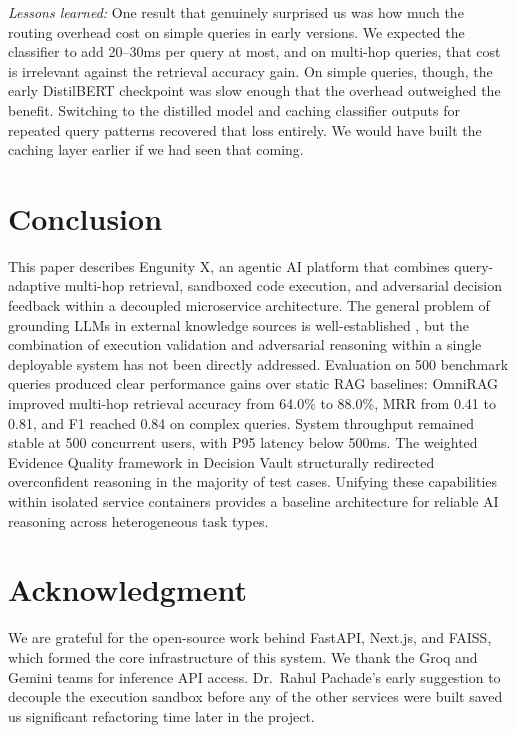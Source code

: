 \documentclass[conference]{IEEEtran}
\begin{document}
\textit{Lessons learned:} One result that genuinely surprised us was how much the routing overhead cost on simple queries in early versions. We expected the classifier to add 20--30ms per query at most, and on multi-hop queries, that cost is irrelevant against the retrieval accuracy gain. On simple queries, though, the early DistilBERT checkpoint was slow enough that the overhead outweighed the benefit. Switching to the distilled model and caching classifier outputs for repeated query patterns recovered that loss entirely. We would have built the caching layer earlier if we had seen that coming.

\section{Conclusion}

This paper describes Engunity X, an agentic AI platform that combines query-adaptive multi-hop retrieval, sandboxed code execution, and adversarial decision feedback within a decoupled microservice architecture. The general problem of grounding LLMs in external knowledge sources is well-established \cite{gao2023ragsurvey}, but the combination of execution validation and adversarial reasoning within a single deployable system has not been directly addressed. Evaluation on 500 benchmark queries produced clear performance gains over static RAG baselines: OmniRAG improved multi-hop retrieval accuracy from 64.0\% to 88.0\%, MRR from 0.41 to 0.81, and F1 reached 0.84 on complex queries. System throughput remained stable at 500 concurrent users, with P95 latency below 500ms. The weighted Evidence Quality framework in Decision Vault structurally redirected overconfident reasoning in the majority of test cases. Unifying these capabilities within isolated service containers provides a baseline architecture for reliable AI reasoning across heterogeneous task types.

\section*{Acknowledgment}

We are grateful for the open-source work behind FastAPI, Next.js, and FAISS, which formed the core infrastructure of this system. We thank the Groq and Gemini teams for inference API access. Dr.\ Rahul Pachade's early suggestion to decouple the execution sandbox before any of the other services were built saved us significant refactoring time later in the project.
\end{document}
